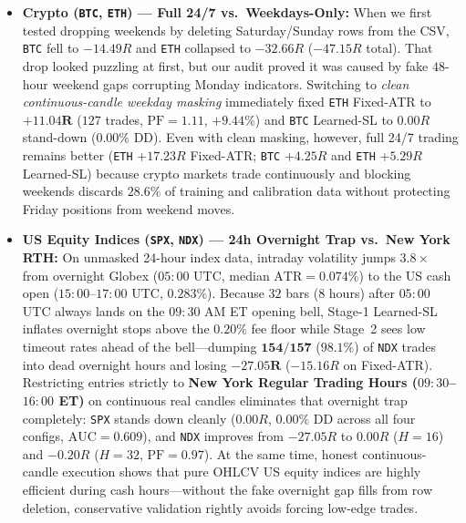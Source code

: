 \documentclass{article}
\newcommand{\ATR}{\mathrm{ATR}}
\newcommand{\PF}{\mathrm{PF}}
\begin{document}
\begin{itemize}
    \item \textbf{Crypto (\texttt{BTC}, \texttt{ETH}) — Full 24/7 vs.\ Weekdays-Only:} When we first tested dropping weekends by deleting Saturday/Sunday rows from the CSV, \texttt{BTC} fell to $-14.49R$ and \texttt{ETH} collapsed to $-32.66R$ ($-47.15R$ total). That drop looked puzzling at first, but our audit proved it was caused by fake $48$-hour weekend gaps corrupting Monday indicators. Switching to \emph{clean continuous-candle weekday masking} immediately fixed \texttt{ETH} Fixed-ATR to $\mathbf{+11.04R}$ ($127$ trades, $\PF = 1.11$, $+9.44\%$) and \texttt{BTC} Learned-SL to $0.00R$ stand-down ($0.00\%$ DD). Even with clean masking, however, full 24/7 trading remains better (\texttt{ETH} $+17.23R$ Fixed-ATR; \texttt{BTC} $+4.25R$ and \texttt{ETH} $+5.29R$ Learned-SL) because crypto markets trade continuously and blocking weekends discards $28.6\%$ of training and calibration data without protecting Friday positions from weekend moves.
    \item \textbf{US Equity Indices (\texttt{SPX}, \texttt{NDX}) — 24h Overnight Trap vs.\ New York RTH:} On unmasked 24-hour index data, intraday volatility jumps $\mathbf{3.8\times}$ from overnight Globex ($05{:}00$ UTC, median $\ATR = 0.074\%$) to the US cash open ($15{:}00$--$17{:}00$ UTC, $0.283\%$). Because $32$ bars ($8$ hours) after $05{:}00$ UTC always lands on the $09{:}30$ AM ET opening bell, Stage-1 Learned-SL inflates overnight stops above the $0.20\%$ fee floor while Stage~2 sees low timeout rates ahead of the bell—dumping $\mathbf{154 / 157}$ ($98.1\%$) of \texttt{NDX} trades into dead overnight hours and losing $\mathbf{-27.05R}$ ($-15.16R$ on Fixed-ATR). Restricting entries strictly to \textbf{New York Regular Trading Hours ($09{:}30$--$16{:}00$ ET)} on continuous real candles eliminates that overnight trap completely: \texttt{SPX} stands down cleanly ($0.00R$, $0.00\%$ DD across all four configs, $\mathrm{AUC} = 0.609$), and \texttt{NDX} improves from $-27.05R$ to $0.00R$ ($H=16$) and $-0.20R$ ($H=32$, $\PF = 0.97$). At the same time, honest continuous-candle execution shows that pure OHLCV US equity indices are highly efficient during cash hours—without the fake overnight gap fills from row deletion, conservative validation rightly avoids forcing low-edge trades.
\end{itemize}
\end{document}
